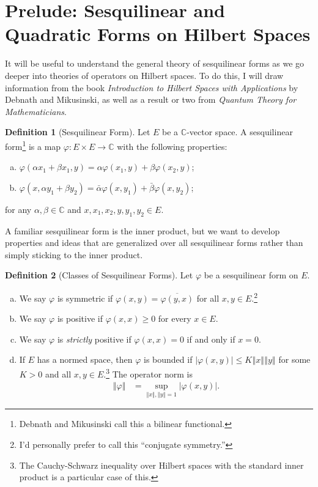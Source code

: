 \documentclass[10pt]{extarticle}
\newcommand{\C}{\mathbb{C}}
\newcommand{\norm}[1]{\left\Vert #1\right\Vert}
\theoremstyle{plain}
\theoremstyle{definition}
\newtheorem*{definition}{Definition}
\theoremstyle{remark}
\begin{document}
  \section{Prelude: Sesquilinear and Quadratic Forms on Hilbert Spaces}%
  It will be useful to understand the general theory of sesquilinear forms as we go deeper into theories of operators on Hilbert spaces. To do this, I will draw information from the book \textit{Introduction to Hilbert Spaces with Applications} by Debnath and Mikusinski, as well as a result or two from \textit{Quantum Theory for Mathematicians}.

  \begin{definition}[Sesquilinear Form]
    Let $E$ be a $\C$-vector space. A sesquilinear form\footnote{Debnath and Mikusinski call this a bilinear functional.} is a map $\varphi: E\times E \rightarrow \C$ with the following properties:
    \begin{enumerate}[(a)]
      \item $\displaystyle \varphi(\alpha x_1 + \beta x_1,y) = \alpha \varphi(x_1,y) + \beta\varphi(x_2,y)$;
      \item $\displaystyle \varphi(x,\alpha y_1 + \beta y_2) = \bar{\alpha}\varphi(x,y_1) + \bar{\beta}\varphi(x,y_2)$;
    \end{enumerate}
    for any $\alpha,\beta \in \C$ and $x,x_1,x_2,y,y_1,y_2 \in E$.
  \end{definition}
  A familiar sesquilinear form is the inner product, but we want to develop properties and ideas that are generalized over all sesquilinear forms rather than simply sticking to the inner product.
  \begin{definition}[Classes of Sesquilinear Forms]
    Let $\varphi$ be a sesquilinear form on $E$.
    \begin{enumerate}[(a)]
      \item We say $\varphi$ is symmetric if $\varphi(x,y) = \overline{\varphi(y,x)}$ for all $x,y\in E$.\footnote{I'd personally prefer to call this ``conjugate symmetry.''}
      \item We say $\varphi$ is positive if $\varphi(x,x) \geq 0$ for every $x\in E$.
      \item We say $\varphi$ is \textit{strictly} positive if $\varphi(x,x) = 0 $ if and only if $x = 0$.
      \item If $E$ has a normed space, then $\varphi$ is bounded if $|\varphi(x,y)| \leq K\norm{x}\norm{y}$ for some $K > 0$ and all $x,y\in E$.\footnote{The Cauchy-Schwarz inequality over Hilbert spaces with the standard inner product is a particular case of this.} The operator norm is
        \begin{align*}
          \norm{\varphi} &= \sup_{\norm{x},\norm{y} = 1}\left\vert \varphi(x,y) \right\vert.
        \end{align*}
    \end{enumerate}
  \end{definition}
\end{document}
